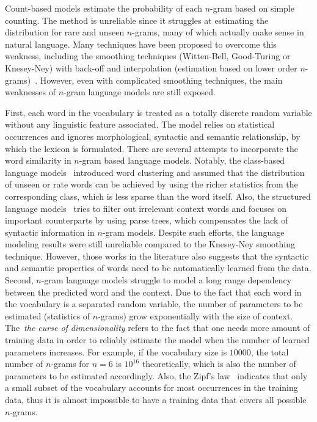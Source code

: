 Count-based models estimate the probability of each $n$-gram based on simple counting. The method is unreliable since it struggles at estimating the distribution for rare and unseen $n$-grams, many of which actually make sense in natural language. Many techniques have been proposed to overcome this weakness, including the smoothing techniques (Witten-Bell, Good-Turing or Knesey-Ney) with back-off and interpolation (estimation based on lower order $n$-grams)~\cite{kneser1995improved,chen1999empirical,heafield2011kenlm,federico2008irstlm,ney1994structuring,witten1991zero}. However, even with complicated smoothing techniques, the main weaknesses of $n$-gram language models are still exposed.

First, each word in the vocabulary is treated as a totally discrete random variable without any linguistic feature associated. The model relies on statistical occurrences and ignores morphological, syntactic and semantic relationship, by which the lexicon is formulated. There are several attempts to incorporate the word similarity in $n$-gram based language models. Notably, the class-based language models~\cite{brown1992class,niesler1996variable} introduced word clustering and assumed that the distribution of unseen or rate words can be achieved by using the richer statistics from the corresponding class, which is less sparse than the word itself. Also, the structured language models~\cite{chelba2000structured,filimonov2009joint} tries to filter out irrelevant context words and focuses on important counterparts by using parse trees, which compensates the lack of syntactic information in $n$-gram models. Despite such efforts, the language modeling results were still unreliable compared to the Knesey-Ney smoothing technique. However, those works in the literature also suggests that the syntactic and semantic properties of words need to be automatically learned from the data. 
%
Second, $n$-gram language models struggle to model a long range dependency between the predicted word and the context. Due to the fact that each word in the vocabulary is a separated random variable, the number of parameters to be estimated (statistics of $n$-grams) grow exponentially with the size of context. The~\textit{the curse of dimensionality} refers to the fact that one needs more amount of training data in order to reliably estimate the model when the number of learned parameters increases. For example, if the vocabulary size is $10000$, the total number of $n$-grams for $n=6$ is $10^16$ theoretically, which is also the number of parameters to be estimated accordingly. Also, the Zipf's law~\cite{kingsley1932selective} indicates that only a small subset of the vocabulary accounts for most occurrences in the training data, thus it is almost impossible to have a training data that covers all possible $n$-grams. 

